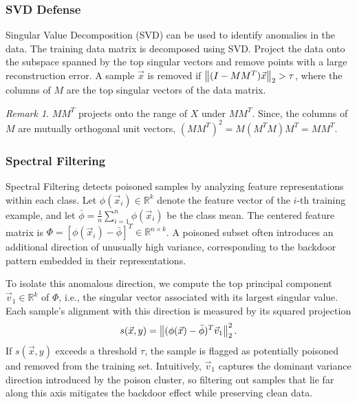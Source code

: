 \documentclass[11pt]{report}
\theoremstyle{remark}
\newtheorem*{remark}{Remark}
\begin{document}
\subsubsection{SVD Defense}
Singular Value Decomposition (SVD) can be used to identify anomalies in the data. The training data matrix is decomposed using SVD. Project the data onto the subspace spanned by the top singular vectors and remove points with a large reconstruction error. A sample $\Vec{x}$ is removed if $\left\lVert (I - MM^T)\Vec{x} \right\rVert_2 > \tau$, where the columns of $M$ are the top singular vectors of the data matrix.
\begin{remark}
$MM^T$ projects onto the range of $X$ under $MM^T$. Since, the columns of $M$ are mutually orthogonal unit vectors, $(MM^T)^2 = M(M^TM)M^T = MM^T$. 
\end{remark}

\subsubsection{Spectral Filtering}
Spectral Filtering detects poisoned samples by analyzing feature representations within each class.
Let $\phi(\Vec{x}_i) \in \mathbb{R}^k$ denote the feature vector of the $i$-th training example, and let $\bar{\phi} = \frac{1}{n}\sum_{i=1}^n \phi(\Vec{x}_i)$ be the class mean.
The centered feature matrix is $\Phi = [\phi(\Vec{x}_i) - \bar{\phi}]^T \in \mathbb{R}^{n \times k}$. A poisoned subset often introduces an additional direction of unusually high variance, corresponding to the backdoor pattern embedded in their representations.

To isolate this anomalous direction, we compute the top principal component $\Vec{v}_1 \in \mathbb{R}^k$ of $\Phi$, i.e., the singular vector associated with its largest singular value.
Each sample’s alignment with this direction is measured by its squared projection 
\[
s(\Vec{x},y) = \left\lVert (\phi(\Vec{x}) - \bar{\phi})^T\Vec{v}_1 \right\rVert_2^2.
\]
If $s(\Vec{x},y)$ exceeds a threshold $\tau$, the sample is flagged as potentially poisoned and removed from the training set.
Intuitively, $\Vec{v}_1$ captures the dominant variance direction introduced by the poison cluster, so filtering out samples that lie far along this axis mitigates the backdoor effect while preserving clean data.
\end{document}
